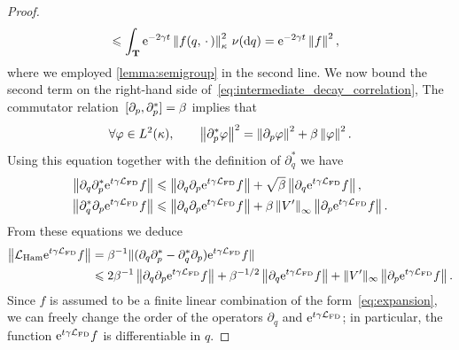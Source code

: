 \documentclass[11pt,a4paper]{article}
\begin{document}
\begin{proof}
\begin{align}
        \label{eq:bound_first_term}
        &\leq \int_{\torus} \e^{-2 \gamma t} \norm{f(q, \dummy) }[\kappa]^2 \, \nu(\d q)
        = \e^{-2\gamma t} \norm{f}^2,
    \end{align}
    where we employed \cref{lemma:semigroup} in the second line.
    We now bound the second term on the right-hand side of~\eqref{eq:intermediate_decay_correlation},
    The commutator relation~$[\partial_p, \partial_p^*] = \beta$ implies that
    \[
        \forall \varphi \in L^2(\kappa), \qquad
        \norm{\partial_p^* \varphi}^2 = \norm{\partial_p \varphi}^2 + \beta \norm{\varphi}^2.
    \]
    Using this equation together with the definition of $\partial_q^*$
    we have
    \begin{align*}
        \norm{\partial_q \partial_p^* \e^{t \gamma \mathcal L_{\rm FD}} f}
        &\leq \norm{\partial_q \partial_p \e^{t \gamma \mathcal L_{\rm FD}} f} + \sqrt{\beta} \norm{\partial_q \e^{t \gamma \mathcal L_{\rm FD}} f}, \\
        \norm{\partial_q^* \partial_p \e^{t \gamma \mathcal L_{\rm FD}} f}
        &\leq \norm{\partial_q \partial_p \e^{t \gamma \mathcal L_{\rm FD}} f}
        + \beta \norm{V'}[\infty] \norm{\partial_p \e^{t \gamma \mathcal L_{\rm FD}} f}.
    \end{align*}
    From these equations we deduce
    \begin{align}
        \notag
        \norm{\mathcal L_{\rm Ham} \e^{t \gamma \mathcal L_{\rm FD}} f}
        &= \beta^{-1} \lVert (\partial_q \partial_p^* - \partial_q^* \partial_p) \e^{t \gamma \mathcal L_{\rm FD}} f \rVert \\
        \label{eq:reasoning_action_lham}
        &\leq 2 \beta^{-1} \norm{\partial_q \partial_p \e^{t \gamma \mathcal L_{\rm FD}} f}
        + \beta^{-1/2} \norm{\partial_q \e^{t \gamma \mathcal L_{\rm FD}} f}
        + \norm*{V'}[\infty] \norm{\partial_p \e^{t \gamma \mathcal L_{\rm FD}} f}.
    \end{align}
    Since $f$ is assumed to be a finite linear combination of the form~\eqref{eq:expansion},
    we can freely change the order of the operators $\partial_q$ and $\mathrm{e}^{t \gamma \mathcal L_{\rm FD}}$;
    in particular, the function $\mathrm{e}^{t \gamma \mathcal L_{\rm FD}} f$ is differentiable in $q$.


\end{proof}
\end{document}
